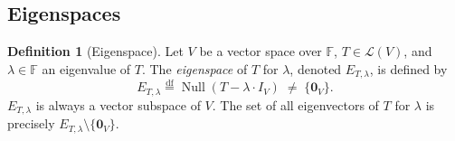 \documentclass[11pt, a4paper, notitlepage]{report}
\theoremstyle{definition}
\newtheorem{definition}[theorem]{Definition}
\theoremstyle{remark}
\begin{document}
\subsection{Eigenspaces}

\begin{definition}[Eigenspace]\label{def:eigenspace}
Let $V$ be a vector space over $\mathbb{F}$, $T \in \mathcal{L}(V)$, and $\lambda \in
\mathbb{F}$ an eigenvalue of $T$. The \emph{eigenspace} of $T$ for $\lambda$, denoted
$E_{T,\lambda}$, is defined by
\[
  E_{T,\lambda} \stackrel{\mathrm{df}}{=} \operatorname{Null}(T - \lambda \cdot I_V)
  \;\neq\; \{\mathbf{0}_V\}.
\]
$E_{T,\lambda}$ is always a vector subspace of $V$. The set of all eigenvectors of $T$
for $\lambda$ is precisely $E_{T,\lambda} \setminus \{\mathbf{0}_V\}$.
\end{definition}
\end{document}
